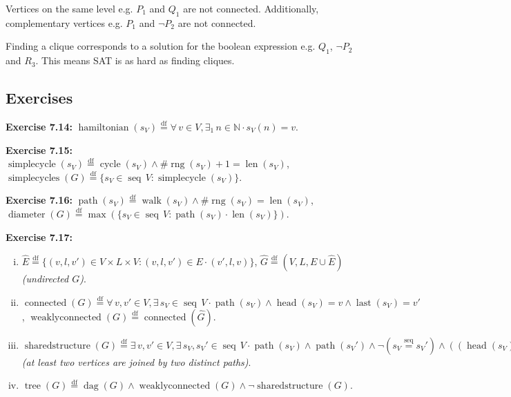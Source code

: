 \documentclass[12pt]{article}
\newcommand{\dfeq}{\stackrel{\text{df}}{=}}
\newcommand{\seqeq}{\stackrel{\text{seq}}{=}}
\DeclareMathOperator{\jdag}{dag}
\DeclareMathOperator{\jseq}{seq}
\DeclareMathOperator{\jsharedstructure}{sharedstructure}
\DeclareMathOperator{\jwalk}{walk}
\DeclareMathOperator{\jhamiltonian}{hamiltonian}
\DeclareMathOperator{\jsimplecycle}{simplecycle}
\DeclareMathOperator{\jsimplecycles}{simplecycles}
\DeclareMathOperator{\jcycle}{cycle}
\DeclareMathOperator{\jconnected}{connected}
\DeclareMathOperator{\jweaklyconnected}{weaklyconnected}
\DeclareMathOperator{\jpath}{path}
\DeclareMathOperator{\jdiameter}{diameter}
\DeclareMathOperator{\jrng}{rng}
\DeclareMathOperator{\jtree}{tree}
\DeclareMathOperator{\jhead}{head}
\DeclareMathOperator{\jlast}{last}
\DeclareMathOperator{\jlen}{len}
\theoremstyle{plain}
\begin{document}
Vertices on the same level e.g. $P_1$ and $Q_1$ are not
connected. Additionally, complementary vertices e.g. $P_1$ and
$\neg P_2$ are not connected.

Finding a clique corresponds to a solution for the boolean
expression e.g. $Q_1$, $\neg P_2$ and $R_3$. This means SAT is
as hard as finding cliques.

\subsection{Exercises}

\textbf{Exercise 7.14:} $\jhamiltonian(s_V) \dfeq \forall\, v
\in V, \exists_{1}\, n \in \mathbb{N} \cdot s_V(n) = v$.

\textbf{Exercise 7.15:} $\jsimplecycle(s_V) \dfeq \jcycle(s_V)
\land \#\jrng(s_V) + 1 = \jlen(s_V)$, $\jsimplecycles(G) \dfeq
\{s_V \in \jseq\, V : \jsimplecycle(s_V)\}$.

\textbf{Exercise 7.16:} $\jpath(s_V) \dfeq \jwalk(s_V) \land
\#\jrng(s_V) = \jlen(s_V)$, $\jdiameter(G) \dfeq \max(\{s_V \in
\jseq\, V : \jpath(s_V) \cdot \jlen(s_V)\})$.

\textbf{Exercise 7.17:}

\begin{enumerate}[(i)]
    \item $\hat{E} \dfeq \{(v, l, v') \in V\times L \times V :
        (v, l, v') \in E \cdot (v', l, v)\}$, $\hat{G} \dfeq (V,
        L, E \cup \hat{E})$ \textit{(undirected $G$)}.
    \item $\jconnected(G) \dfeq \forall\, v, v' \in V, \exists\,
        s_V \in \jseq\, V \cdot \jpath(s_V) \land \jhead(s_V) =
        v \land \jlast(s_V) = v'$, $\jweaklyconnected(G) \dfeq
        \jconnected(\hat{G})$.
    \item $\jsharedstructure(G) \dfeq \exists\, v, v' \in V,
        \exists\, s_V, s_V' \in \jseq\, V \cdot \jpath(s_V)
        \land \jpath(s_V') \land \neg(s_V \seqeq s_V') \land
        ((\jhead(s_V) = \jhead(s_V') = v \land \jlast(s_V) =
        \jlast(s_V') = v') \vee (\jhead(s_V) = \jlast(s_V') = v
        \land \jlast(s_V) = \jhead(s_V') = v'))$ \textit{(at
        least two vertices are joined by two distinct paths)}.
    \item $\jtree(G) \dfeq \jdag(G) \land \jweaklyconnected(G)
        \land \neg \jsharedstructure(G)$.
\end{enumerate}
\end{document}
